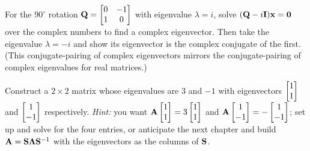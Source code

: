 \begin{exercise}
\label{ch23:ex-complex-evec}
For the $90^\circ$ rotation $\mathbf{Q}=\begin{bmatrix}0 & -1\\ 1 & 0\end{bmatrix}$
with eigenvalue $\lambda=i$, solve $(\mathbf{Q}-i\mathbf{I})\mathbf{x}=\mathbf{0}$ over the
complex numbers to find a complex eigenvector. Then take the eigenvalue
$\lambda=-i$ and show its eigenvector is the complex conjugate of the first. (This
conjugate-pairing of complex eigenvectors mirrors the conjugate-pairing of complex
eigenvalues for real matrices.)
\end{exercise}

\begin{exercise}
\label{ch23:ex-build}
Construct a $2\times 2$ matrix whose eigenvalues are $3$ and $-1$ with
eigenvectors $\begin{bmatrix}1\\1\end{bmatrix}$ and $\begin{bmatrix}1\\-1\end{bmatrix}$ respectively. \emph{Hint:} you
want $\mathbf{A}\begin{bmatrix}1\\1\end{bmatrix}=3\begin{bmatrix}1\\1\end{bmatrix}$ and $\mathbf{A}\begin{bmatrix}1\\-1\end{bmatrix}=-\begin{bmatrix}1\\-1\end{bmatrix}$;
set up and solve for the four entries, or anticipate the next chapter and build
$\mathbf{A}=\mathbf{S}\mathbf{\Lambda}\mathbf{S}^{-1}$ with the eigenvectors as the columns of
$\mathbf{S}$.
\end{exercise}
